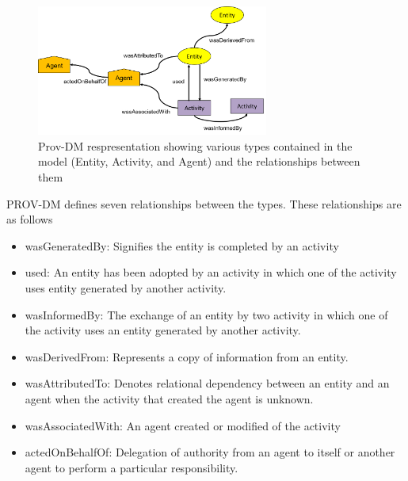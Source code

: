 \documentclass[conference]{IEEEtran}
\begin{document}
\begin{figure}[h!]
\begin{center}

\includegraphics[width=3.0in]{prov_dm_2.PNG}
\end{center}
\caption{Prov-DM respresentation showing various types contained in the model (Entity, Activity, and Agent) and the relationships between them }
\label{prov_rep}
\end{figure}


\par PROV-DM defines seven relationships between the types. These relationships are as follows

\begin{itemize}
\item wasGeneratedBy:  Signifies the entity is completed by an activity

\item used: An entity has been adopted by an activity in which one of the activity uses entity generated by another activity.

\item wasInformedBy: The exchange of an entity by two activity in which one of the activity uses an entity generated by another activity.

\item wasDerivedFrom: Represents a copy of information from an entity. 

\item wasAttributedTo: Denotes relational dependency between an entity and an agent when the activity that created the agent is unknown.

\item wasAssociatedWith: An agent created or modified of the activity

\item actedOnBehalfOf: Delegation of authority from an agent to itself or another agent to perform a particular responsibility. 



\end{itemize}
\end{document}
